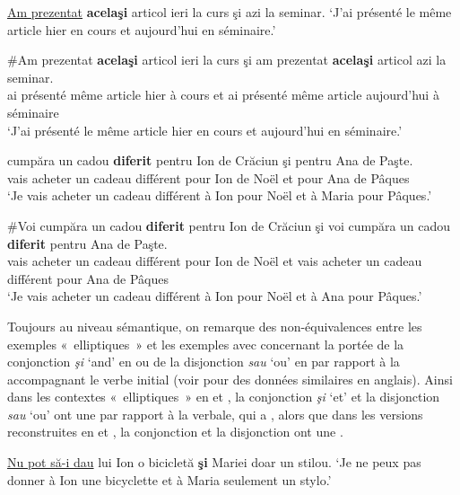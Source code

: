 \ea \label{ch2:ex294}
\ea \uline{Am prezentat} \textbf{acelaşi} articol ieri la curs şi azi la seminar. \label{ch2:ex294a}
\glt ‘J’ai présenté le même article hier en cours et aujourd’hui en séminaire.’

\ex 
\gll \#Am  prezentat  \textbf{acelaşi}  articol  ieri  la  curs  şi  am  prezentat  \textbf{acelaşi}  articol azi  la  seminar. \label{ch2:ex294b}\\
ai  présenté  même  article  hier  à  cours  et  ai  présenté  même  article aujourd’hui  à  séminaire\\
\glt ‘J’ai présenté le même article hier en cours et aujourd’hui en séminaire.’
\z
\z

\largerpage
\ea \label{ch2:ex295}
\ea 
\gll {}  cumpăra  un  cadou  \textbf{diferit}  pentru  Ion  de  Crăciun  şi  pentru  Ana  de  Paşte. \label{ch2:ex295a}\\
vais  acheter  un  cadeau  différent  pour  Ion  de  Noël  et  pour  Ana  de  Pâques\\
\glt ‘Je vais acheter un cadeau différent à Ion pour Noël et à Maria pour Pâques.’

\ex  
\gll \#Voi  cumpăra  un  cadou  \textbf{diferit}  pentru  Ion  de  Crăciun  şi  voi  cumpăra  un cadou  \textbf{diferit}  pentru  Ana  de  Paşte. \label{ch2:ex295b}\\
vais  acheter  un  cadeau  différent  pour  Ion  de  Noël  et  vais  acheter  un cadeau  différent  pour  Ana  de  Pâques\\
\glt ‘Je vais acheter un cadeau différent à Ion pour Noël et à Ana pour Pâques.’
\z
\z

Toujours au niveau sémantique, on remarque des non-équivalences entre les exemples «~elliptiques~» et les exemples avec  concernant la portée de la conjonction \textit{şi} ‘and’ en  ou de la disjonction \textit{sau} ‘ou’ en  par rapport à la  accompagnant le verbe initial (voir \citealt{HuddlestonEtAl2002} pour des données similaires en anglais). Ainsi dans les contextes «~elliptiques~» en  et , la conjonction \textit{şi} ‘et’ et la disjonction \textit{sau} ‘ou’ ont une  par rapport à la  verbale, qui a , alors que dans les versions reconstruites en  et , la conjonction et la disjonction ont une .   

\ea \label{ch2:ex296}
\ea \uline{Nu pot să-i dau} lui Ion o bicicletă \textbf{şi} Mariei doar un stilou. \label{ch2:ex296a}
\glt ‘Je ne peux pas donner à Ion une bicyclette et à Maria seulement un stylo.’

